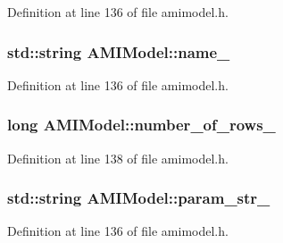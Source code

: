 Definition at line 136 of file amimodel.\+h.

\hypertarget{class_a_m_i_model_a42e00992da9baf93d81d1d9fcd32d8e6}{}
\subsubsection[{name\+\_\+}]{\setlength{\rightskip}{0pt plus 5cm}std\+::string A\+M\+I\+Model\+::name\+\_\+\hspace{0.3cm}{\ttfamily [protected]}}\label{class_a_m_i_model_a42e00992da9baf93d81d1d9fcd32d8e6}


Definition at line 136 of file amimodel.\+h.

\hypertarget{class_a_m_i_model_aaaf94b76a519e60318e1874bb190e9a8}{}
\subsubsection[{number\+\_\+of\+\_\+rows\+\_\+}]{\setlength{\rightskip}{0pt plus 5cm}long A\+M\+I\+Model\+::number\+\_\+of\+\_\+rows\+\_\+\hspace{0.3cm}{\ttfamily [protected]}}\label{class_a_m_i_model_aaaf94b76a519e60318e1874bb190e9a8}


Definition at line 138 of file amimodel.\+h.

\hypertarget{class_a_m_i_model_ab7aeef08245acc654271341cdf0139f9}{}
\subsubsection[{param\+\_\+str\+\_\+}]{\setlength{\rightskip}{0pt plus 5cm}std\+::string A\+M\+I\+Model\+::param\+\_\+str\+\_\+\hspace{0.3cm}{\ttfamily [protected]}}\label{class_a_m_i_model_ab7aeef08245acc654271341cdf0139f9}


Definition at line 136 of file amimodel.\+h.

\hypertarget{class_a_m_i_model_a4da53456e13a1224f2bb47396ab0ecbd}{}
